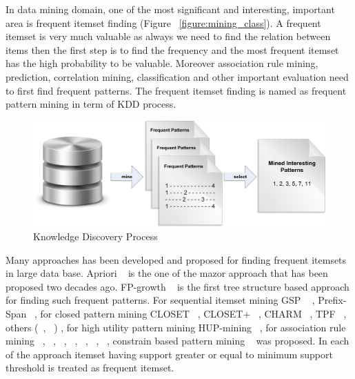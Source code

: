 In data mining domain, one of the most significant and interesting, important area is frequent itemset finding (Figure ~\ref{figure:mining_class}). A frequent itemset is very much valuable as always we need to find the relation between items then the first step is to find the frequency and the most frequent itemset has the high probability to be valuable. Moreover association rule mining, prediction, correlation mining, classification and other important evaluation need to first find frequent patterns. The frequent itemset finding is named as frequent pattern mining in term of KDD process.\\
\begin{figure}
\centering
  \includegraphics[width=.9\textwidth]{images/frequent_flow.jpg}
\caption{Knowledge Discovery Process}
\label{figure:frequent_flow}
\end{figure}
Many approaches has been developed and proposed for finding frequent itemsets in large data base. Apriori ~\cite{apriori} is the one of the mazor approach that has been proposed two decades ago. FP-growth ~\cite{fp_growth} is the first tree structure based approach for finding such frequent patterns. For sequential itemset mining GSP ~\cite{gsp} , Prefix-Span ~\cite{prefix_span}, for closed pattern mining CLOSET ~\cite{closet}, CLOSET$+$ ~\cite{closet_plus}, CHARM ~\cite{charm}, TPF ~\cite{tpf}, others (~\cite{close_1}, ~\cite{close_2}) , for high utility pattern mining HUP-mining ~\cite{hup_mining}, for association rule mining ~\cite{ass_01}, ~\cite{ass_02}, ~\cite{ass_03}, ~\cite{ass_04}, ~\cite{ass_05}, ~\cite{ass_06}, ~\cite{ass_07}, constrain based pattern mining ~\cite{const_01} was proposed. In each of the approach itemset having support greater or equal to minimum support threshold is treated as frequent itemset.

